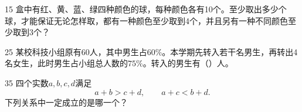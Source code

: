 
\begin{question}{1}{5}
盒中有红、黄、蓝、绿四种颜色的球，每种颜色各有10个。至少取出多少个球，才能保证无论怎样取，都有一种颜色至少取到4个，并且另有一种不同颜色至少取到3个？
\begin{choices}
\end{choices}
\end{question}

\begin{question}{2}{5}
某校科技小组原有60人，其中男生占\(60\%\)。本学期先转入若干名男生，再转出4名女生，此时男生占小组总人数的\(75\%\)。转入的男生有（\quad）人。
\begin{choices}
\end{choices}
\end{question}

\begin{question}{3}{5}
四个实数\(a,b,c,d\)满足
\[
  a+b>c+d,\qquad a+c<b+d.
\]
下列关系中一定成立的是哪一个？
\begin{choices}
\end{choices}
\end{question}

